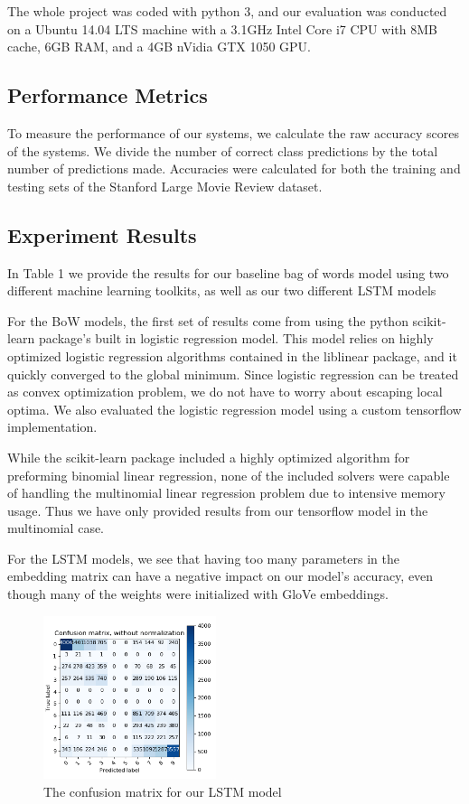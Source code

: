 \documentclass[conference]{IEEEtran}
\begin{document}
    The whole project was coded with python 3, and our evaluation was conducted on
    a Ubuntu 14.04 LTS machine with a 3.1GHz Intel Core i7 CPU with 8MB cache,
    6GB RAM, and a 4GB nVidia GTX 1050 GPU.
    
\subsection{Performance Metrics}
    To measure the performance of our systems, we calculate the raw accuracy
    scores of the systems. We divide the number of correct class predictions
    by the total number of predictions made. Accuracies were calculated
    for both the training and testing sets of the Stanford Large Movie Review dataset.
    
\subsection{Experiment Results}
    In Table 1 we provide the results for our baseline bag of words model using
    two different machine learning toolkits, as well as our two different LSTM models
    
    For the BoW models, the first set of results come from
    using the python scikit-learn package's built in logistic regression model.
    This model relies on highly optimized logistic regression algorithms
    contained in the liblinear \cite{Fan:2008:LLL:1390681.1442794} package,
    and it quickly converged to the global minimum. Since logistic regression
    can be treated as convex optimization problem, we do not have to worry 
    about escaping local optima. We also evaluated the logistic regression
    model using a custom tensorflow implementation. 
        
    While the scikit-learn package included a highly optimized algorithm for
    preforming binomial linear regression, none of the included solvers were
    capable of handling the multinomial linear regression problem due to intensive
    memory usage. Thus we have only provided results from our tensorflow
    model in the multinomial case.
    
    For the LSTM models, we see that having too many parameters in the 
    embedding matrix can have a negative impact on our model's accuracy,
    even though many of the weights were initialized with GloVe embeddings.
    
    \begin{figure}
        \includegraphics[width=0.45\textwidth]{figure/conf_matrix}
        \caption{The confusion matrix for our LSTM model}
    \end{figure}
    
\end{document}
